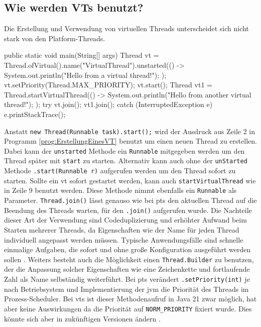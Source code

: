 \subsection{Wie werden VTs benutzt?}
\label{subsec:WieWerdenVTsBenutzt?}

    Die Erstellung und Verwendung von virtuellen Threads unterscheidet sich nicht stark von den Platform-Threads. 
    \begin{program} [H]
        \caption{Erstellung eines \Glspl{vt}}
        \label{prog:ErstellungEinesVT}
    \begin{JavaCode}[language=Java, numbers=left]
public static void main(String[] args) {
    Thread vt = Thread.ofVirtual().name("VirtualThread").unstarted(() -> {
        System.out.println("Hello from a virtual thread!");
    });
    vt.setPriority(Thread.MAX_PRIORITY);
    vt.start();
    Thread vt1 = Thread.startVirtualThread(() -> {
        System.out.println("Hello from another virtual thread!");
    });
    try {
        vt.join(); vt1.join();
    } catch (InterruptedException e) {
        e.printStackTrace();
    }
}\end{JavaCode}
    \end{program}
    Anstatt \texttt{new Thread(Runnable task).start();} wird der Ausdruck aus Zeile 2 in Programm 
    \ref{prog:ErstellungEinesVT} benutzt um einen neuen Thread zu erstellen. Dabei kann der \texttt{unstarted} Methode ein \texttt{Runnable} mitgegeben werden um den Thread später mit \texttt{start} zu starten. Alternativ kann auch ohne der 
    \texttt{unStarted} Methode \texttt{.start(Runnable r)} aufgerufen werden um den Thread sofort zu starten. Sollte ein \gls{vt} sofort gestartet werden, kann auch \texttt{startVirtualThread} wie in Zeile 9 benutzt werden. Diese Methode nimmt ebenfalls ein
    \texttt{Runnable} als Parameter. \texttt{Thread.join()} lässt genauso wie bei \Glspl{pt} den aktuellen Thread 
    auf die Beendung des Threads warten, für den \texttt{.join()} aufgerufen wurde. Die Nachteile dieser Art der Verwendung sind Codeduplizierung und erhöhter Aufwand
    beim Starten mehrerer Threads, da Eigenschaften wie der Name für jeden Thread individuell angepasst werden müssen. Typische Anwendungsfälle sind schnelle
    einmalige Aufgaben, die sofort und ohne große Konfiguration ausgeführt werden sollen \cite{oracle21Thread}.
    Weiters besteht auch die Möglichkeit einen \texttt{Thread.Builder} zu benutzen, der die Anpassung solcher Eigenschaften wie eine Zeichenkette und fortlaufende Zahl
    als Name selbständig weiterführt.
    Bei \Glspl{pt} verändert \texttt{.setPriority(int)} je nach Betriebsystem und Implementierung der \gls{jvm} die Priorität des Threads im Prozess-Scheduler. Bei \Glspl{vt} ist dieser Methodenaufruf in Java 21 zwar
    möglich, hat aber keine Auswirkungen da die Priorität auf \texttt{NORM\_PRIORITY} fixiert wurde. Dies könnte sich aber in zukünftigen Versionen ändern \cite{JEP444}.

